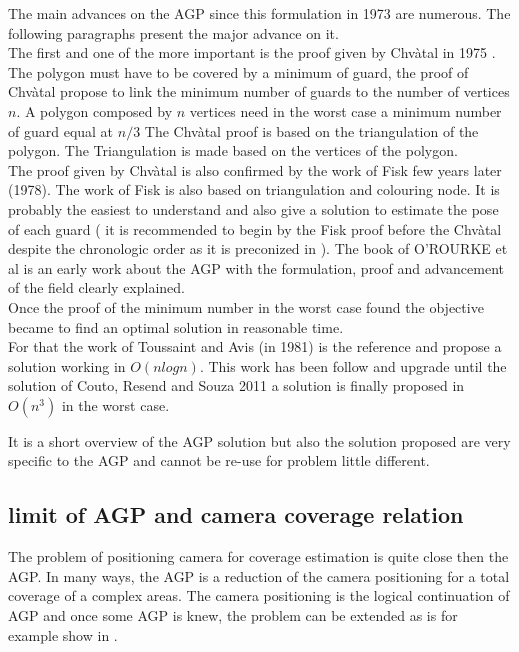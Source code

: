 	The main advances on the AGP since this formulation in 1973 are numerous. The following paragraphs present the major advance on it.\\
	 The first and one of the more important is the proof given by Chvàtal in 1975 \cite{44*chvatal1975}.  The polygon must have to be covered by a minimum of guard, the proof of Chvàtal propose to link the minimum number of guards to the number of vertices $n$. 
A polygon composed by $n$ vertices need in the worst case a minimum number of guard equal at $n/3$ The Chvàtal proof is based on the triangulation of the polygon. The Triangulation is made based on the vertices of the polygon.\\
	     The proof given by Chvàtal is also confirmed by the work of Fisk  few years later (1978). The work of Fisk is also based on triangulation and colouring node. It is probably the easiest to understand and also give a solution to estimate the pose of each guard ( it is recommended to begin by the Fisk proof before the Chvàtal despite the chronologic order as it is preconized in \cite{219*orourke1987}). The book of O'ROURKE et al \cite{219*orourke1987} is an early work about the AGP with the formulation, proof and advancement of the field clearly explained. \\
Once the proof of the minimum number in the worst case found the objective became to find an optimal solution in reasonable time. \\
For that the work of Toussaint and Avis (in 1981) is the reference and propose a solution working in $O(n log n)$. This work has been follow and upgrade until the solution of Couto, Resend and Souza  2011 \cite{224*couto2011} a solution is finally proposed in $O(n^3)$  in the worst case. 

It is a short overview of the AGP solution but also the solution proposed are very specific to the AGP and cannot be re-use for problem little different.

	
	\subsection{limit of AGP and camera coverage relation}


The problem of positioning camera for coverage estimation is quite close then the AGP. In many ways, the AGP is a reduction of the camera positioning for a total coverage of a complex areas. The camera positioning is the logical continuation of AGP and once some AGP is knew, the problem can be extended as is for  example show in \cite{221*fleishman2000,33*reddy2012,43*erdem2006}.

